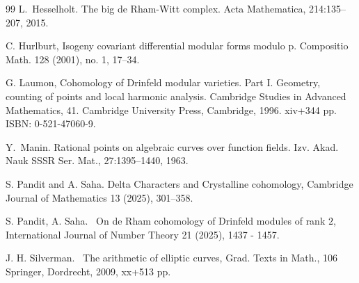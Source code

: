 \documentclass{amsart}
\numberwithin {equation}{section}
\begin{document}
\begin{thebibliography}{99}
L.~Hesselholt.
\newblock The big de {R}ham-{W}itt complex.
\newblock Acta Mathematica, 214:135--207, 2015.

C. Hurlburt, Isogeny covariant differential modular forms modulo p. Compositio Math. 128 (2001), no. 1, 17–34. 


 G. Laumon, Cohomology of Drinfeld modular varieties. Part I. Geometry, counting of points and local harmonic analysis. Cambridge Studies in Advanced Mathematics, 41. Cambridge University Press, Cambridge, 1996. xiv+344 pp. ISBN: 0-521-47060-9.

Y.~Manin.
\newblock Rational points on algebraic curves over function fields.
\newblock Izv. Akad. Nauk SSSR Ser. Mat., 27:1395--1440, 1963.

S. Pandit and A. Saha.
\newblock Delta Characters and Crystalline cohomology, 
\newblock Cambridge Journal of Mathematics 13 (2025), 301–358.

S. Pandit, A. Saha.
~On de Rham cohomology of Drinfeld modules of rank $2$, 
International Journal of Number Theory 21 (2025), 1437 - 1457. 

J. H. Silverman.
~The arithmetic of elliptic curves,
Grad. Texts in Math., 106
Springer, Dordrecht, 2009, xx+513 pp. 

\end{thebibliography}
\end{document}
